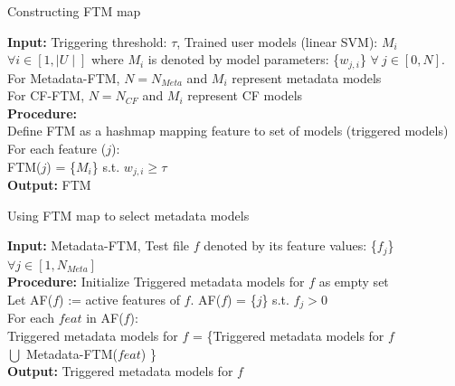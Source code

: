 {\begin{algorithm}[t!]
 {\fontsize{8pt}{1em}\selectfont
 \caption{Constructing FTM map}
 \label{alg:speedupTraining} 
\textbf{Input:}  
Triggering threshold: $\tau$, Trained user models (linear SVM): $M_i$ $\forall i \in [1,\mid\!\!U\!\!\mid]$ 
where $M_i$ is denoted by model parameters:  \{$w_{j,i}$\} $ \forall~j \in [0, N ]$.   \\
For Metadata-FTM, $N=N_{Meta}$ and $M_i$ represent metadata models \\ 
For CF-FTM, $N=N_{CF}$ and $M_i$ represent CF models \\ 
\textbf{Procedure: } \\
Define FTM as a hashmap mapping feature to set of models (triggered models) \\
For each feature ($j$): \\ 
\hspace*{2mm} FTM($j$) = \{$M_i$\} s.t. $w_{j,i} \ge \tau$ \\ 
\textbf{Output:} FTM 
 }
 \end{algorithm}

 \begin{algorithm}[t!]
 {\fontsize{8pt}{1em}\selectfont
 \caption{Using FTM map to select metadata models} 
 \label{alg:speedupMetaTesting} 
 \textbf{Input:} 
Metadata-FTM, Test file $f$ denoted by its feature values: \{$f_j$\} $\forall j \in [1,N_{Meta}]$ \\ 
\textbf{Procedure: } 
Initialize Triggered metadata models for $f$ as empty set \\ 
Let AF($f$) := active features of $f$. AF($f$) = \{$j$\} s.t. $f_j  > 0$ \\
For each $feat$ in AF($f$): \\ 
\hspace*{2mm} Triggered metadata models for $f$ = \big\{Triggered metadata models for $f$ \\  \hspace*{45mm} $\bigcup$  Metadata-FTM($feat$) \big\} \\ 
\textbf{Output:} Triggered metadata models for $f$ 
 }
 \end{algorithm}

}
